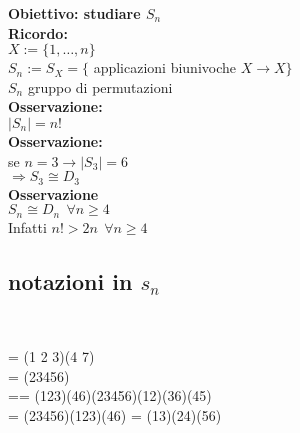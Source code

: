 \documentclass[12px]{article}
\begin{document}
{\begin{center}
	  \end{center}
	  \textbf{Obiettivo: studiare $S_n$}\\
	  \textbf{Ricordo:}\\
	  $X:=\{1,\ldots,n\}$\\
	  $S_n:=S_X= \{$ applicazioni biunivoche $X \rightarrow X\}$\\
	  $S_n$ gruppo di permutazioni\\
	   \textbf{Osservazione:}\\
	   $|S_n| = n!$\\
	   \textbf{Osservazione:}\\
	   se $n=3 \rightarrow |S_3| = 6$\\
	   $ \Rightarrow S_3 \cong D_3$ \\
	   \textbf{Osservazione}\\
	   $S_n\cong D_n \ \ \forall n\geq 4$\\
	   Infatti  $n! > 2n \ \ \forall n\geq 4$ 
	   \subsection{notazioni in $s_n$}\\
	   \begin{aligend*}
	   	\sigma = (1 2 3)(4 7)\\
	   	\tau = (23456)\\
		\sigma\tau=\sigma\circ\tau = (123)(46)(23456)(12)(36)(45)\\
		\tau\circ\sigma = (23456)(123)(46) = (13)(24)(56)


\end{aligend*}}
\end{document}
